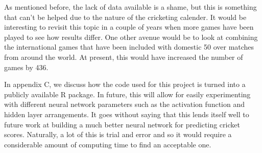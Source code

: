 As mentioned before, the lack of data available is a shame, but this is something that can't be helped due to the nature of the cricketing calender. It would be interesting to revisit this topic in a couple of years when more games have been played to see how results differ. One other avenue would be to look at combining the international games that have been included with domestic 50 over matches from around the world. At present, this would have increased the number of games by 436. 

In appendix C, we discuss how the code used for this project is turned into a publicly available R package. In future, this will allow for easily experimenting with different neural 
network parameters such as the activation function and hidden layer arrangements. It goes without saying that this lends itself well to future work at building a much better neural network for predicting cricket scores.
Naturally, a lot of this is trial and error and so it would require a considerable amount of computing time to find an acceptable one. 
